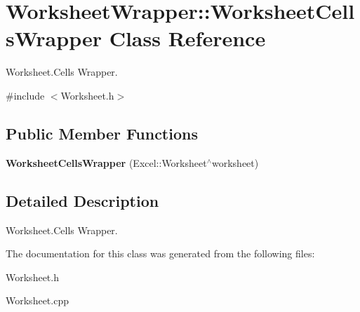 \hypertarget{class_worksheet_wrapper_1_1_worksheet_cells_wrapper}{}\section{Worksheet\+Wrapper\+:\+:Worksheet\+Cells\+Wrapper Class Reference}
\label{class_worksheet_wrapper_1_1_worksheet_cells_wrapper}


Worksheet.\+Cells Wrapper.  




{\ttfamily \#include $<$Worksheet.\+h$>$}

\subsection*{Public Member Functions}
\begin{DoxyCompactItemize}
\item 
\hypertarget{class_worksheet_wrapper_1_1_worksheet_cells_wrapper_a47272e45d9aaca40a3b973720661372d}{}{\bfseries Worksheet\+Cells\+Wrapper} (Excel\+::\+Worksheet$^\wedge$worksheet)\label{class_worksheet_wrapper_1_1_worksheet_cells_wrapper_a47272e45d9aaca40a3b973720661372d}

\end{DoxyCompactItemize}


\subsection{Detailed Description}
Worksheet.\+Cells Wrapper. 

The documentation for this class was generated from the following files\+:\begin{DoxyCompactItemize}
\item 
Worksheet.\+h\item 
Worksheet.\+cpp\end{DoxyCompactItemize}
